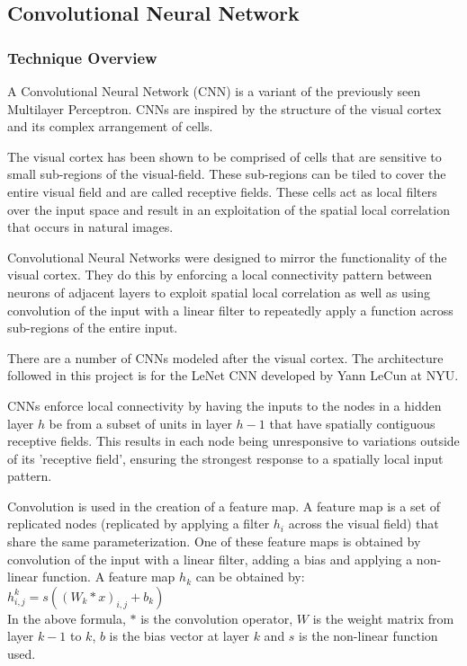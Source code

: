\documentclass{article}
\begin{document}
\subsection{Convolutional Neural Network}
  \subsubsection{Technique Overview}
  
  A Convolutional Neural Network (CNN) is a variant of the previously seen Multilayer Perceptron. CNNs are inspired by the
  structure of the visual cortex and its complex arrangement of cells.
  
  The visual cortex has been shown to be comprised of cells that are sensitive to small sub-regions of the visual-field. These
  sub-regions can be tiled to cover the entire visual field and are called receptive fields. These cells act as local filters
  over the input space and result in an exploitation of the spatial local correlation that occurs in natural images.
  
  Convolutional Neural Networks were designed to mirror the functionality of the visual cortex. They do this by enforcing a
  local connectivity pattern between neurons of adjacent layers to exploit spatial local correlation as well as using
  convolution of the input with a linear filter to repeatedly apply a function across sub-regions of the entire input.
  
  There are a number of CNNs modeled after the visual cortex. The architecture followed in this project is for the LeNet CNN
  developed by Yann LeCun at NYU.
  
  CNNs enforce local connectivity by having the inputs to the nodes in a hidden layer $h$ be from a subset of units in layer
  $h-1$ that have spatially contiguous receptive fields. This results in each node being unresponsive to variations outside
  of its 'receptive field', ensuring the strongest response to a spatially local input pattern.
  
  Convolution is used in the creation of a feature map. A feature map is a set of replicated nodes (replicated by applying a
  filter $h_{i}$ across the visual field) that share the same parameterization. One of these feature maps is obtained by
  convolution of the input with a linear filter, adding a bias and applying a non-linear function. A feature map $h_{k}$ can
  be obtained by: \\
  \vspace{1mm}
  \hspace{7mm}$h_{i,j}^{k} = s((W_{k} \ast x)_{i,j} + b_{k})$ \\
  In the above formula, $\ast$ is the convolution operator, $W$ is the weight matrix from layer $k-1$ to $k$, $b$ is the bias
  vector at layer $k$ and $s$ is the non-linear function used.
  
\end{document}
